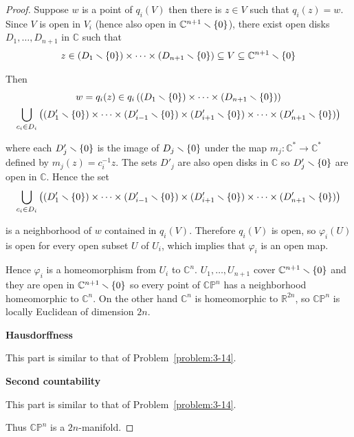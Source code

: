 \begin{proof}
	Suppose $w$ is a point of $q_{i}(V)$ then there is $z\in V$ such that $q_{i}(z) = w$. Since $V$ is open in $V_{i}$ (hence also open in $\mathbb{C}^{n+1}\smallsetminus\left\{{0}\right\}$), there exist open disks $D_{1}, \ldots, D_{n+1}$ in $\mathbb{C}$ such that
	\begin{align*}
		z \in (D_{1}\smallsetminus\left\{{0}\right\}) \times \cdots \times (D_{n+1}\smallsetminus\left\{{0}\right\}) \subseteq V \subseteq \mathbb{C}^{n+1}\smallsetminus\left\{{0}\right\}
	\end{align*}

	Then
	\begin{multline*}
		w = q_{i}(z) \in q_{i}\left((D_{1}\smallsetminus\left\{{0}\right\}) \times \cdots \times (D_{n+1}\smallsetminus\left\{{0}\right\})\right) \\
		\bigcup_{c_{i} \in D_{i}}\left( (D_{1}' \smallsetminus \left\{{0}\right\}) \times \cdots \times (D_{i-1}' \smallsetminus \left\{{0}\right\}) \times (D_{i+1}' \smallsetminus \left\{{0}\right\}) \times \cdots \times (D_{n+1}' \smallsetminus \left\{{0}\right\}) \right)
	\end{multline*}

	where each $D_{j}'\smallsetminus\left\{{0}\right\}$ is the image of $D_{j}\smallsetminus\left\{{0}\right\}$ under the map $m_{j}: \mathbb{C}^{*}\to \mathbb{C}^{*}$ defined by $m_{j}(z) = c_{i}^{-1}z$. The sets $D'_{j}$ are also open disks in $\mathbb{C}$ so $D_{j}'\smallsetminus\left\{{0}\right\}$ are open in $\mathbb{C}$. Hence the set
	\begin{align*}
		\bigcup_{c_{i} \in D_{i}}\left( (D_{1}' \smallsetminus \left\{{0}\right\}) \times \cdots \times (D_{i-1}' \smallsetminus \left\{{0}\right\}) \times (D_{i+1}' \smallsetminus \left\{{0}\right\}) \times \cdots \times (D_{n+1}' \smallsetminus \left\{{0}\right\}) \right)
	\end{align*}

	is a neighborhood of $w$ contained in $q_{i}(V)$. Therefore $q_{i}(V)$ is open, so $\varphi_{i}(U)$ is open for every open subset $U$ of $U_{i}$, which implies that $\varphi_{i}$ is an open map.

	Hence $\varphi_{i}$ is a homeomorphism from $U_{i}$ to $\mathbb{C}^{n}$. $U_{1}, \ldots, U_{n+1}$ cover $\mathbb{C}^{n+1}\smallsetminus\left\{{0}\right\}$ and they are open in $\mathbb{C}^{n+1}\smallsetminus\left\{{0}\right\}$ so every point of $\mathbb{CP}^{n}$ has a neighborhood homeomorphic to $\mathbb{C}^{n}$. On the other hand $\mathbb{C}^{n}$ is homeomorphic to $\mathbb{R}^{2n}$, so $\mathbb{CP}^{n}$ is locally Euclidean of dimension $2n$.

	\textbf{Hausdorffness}

	This part is similar to that of Problem~\ref{problem:3-14}.

	\textbf{Second countability}

	This part is similar to that of Problem~\ref{problem:3-14}.

	Thus $\mathbb{CP}^{n}$ is a $2n$-manifold.
\end{proof}

